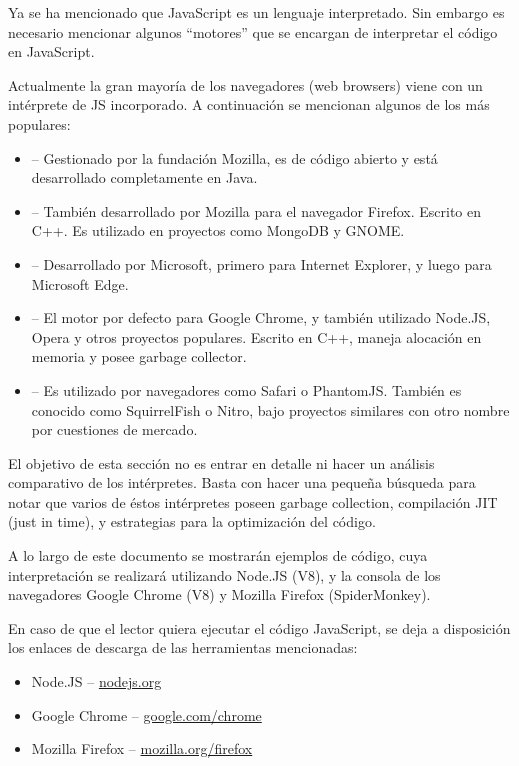 Ya se ha mencionado que JavaScript es un lenguaje interpretado. Sin embargo es necesario mencionar algunos "`motores"' que se encargan de interpretar el código en JavaScript.

Actualmente la gran mayoría de los navegadores (web browsers) viene con un intérprete de JS incorporado. A continuación se mencionan algunos de los más populares:

\begin{itemize}
\item {} -- Gestionado por la fundación Mozilla, es de código abierto y está desarrollado completamente en Java.
\item {} -- También desarrollado por Mozilla para el navegador Firefox. Escrito en C++. Es utilizado en proyectos como MongoDB y GNOME.
\item {} -- Desarrollado por Microsoft, primero para Internet Explorer, y luego para Microsoft Edge.
\item {} -- El motor por defecto para Google Chrome, y también utilizado Node.JS, Opera y otros proyectos populares. Escrito en C++, maneja alocación en memoria y posee garbage collector.
\item {} -- Es utilizado por navegadores como Safari o PhantomJS. También es conocido como SquirrelFish o Nitro, bajo proyectos similares con otro nombre por cuestiones de mercado.
\end{itemize}

El objetivo de esta sección no es entrar en detalle ni hacer un análisis comparativo de los intérpretes. Basta con hacer una pequeña búsqueda para notar que varios de éstos intérpretes poseen garbage collection, compilación JIT (just in time), y estrategias para la optimización del código.

A lo largo de este documento se mostrarán ejemplos de código, cuya interpretación se realizará utilizando Node.JS (V8), y la consola de los navegadores Google Chrome (V8) y Mozilla Firefox (SpiderMonkey).

En caso de que el lector quiera ejecutar el código JavaScript, se deja a disposición los enlaces de descarga de las herramientas mencionadas:

\begin{itemize}
\item Node.JS -- \href{https://nodejs.org/es/}{nodejs.org}
\item Google Chrome -- \href{https://google.com/chrome}{google.com/chrome}
\item Mozilla Firefox -- \href{https://www.mozilla.org/firefox}{mozilla.org/firefox}
\end{itemize}

